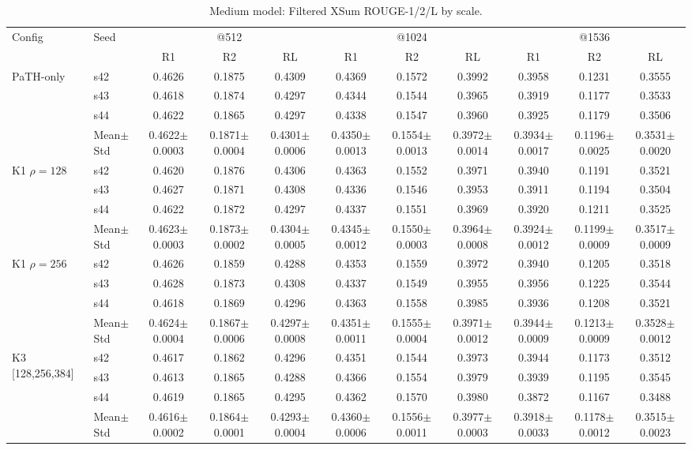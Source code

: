 \begin{table}[t]
\centering
\small
\begin{tabular}{llccccccccc}
\toprule
Config & Seed & \multicolumn{3}{c}{@512} & \multicolumn{3}{c}{@1024} & \multicolumn{3}{c}{@1536} \\
\cmidrule(lr){3-5} \cmidrule(lr){6-8} \cmidrule(lr){9-11}
 & & R1 & R2 & RL & R1 & R2 & RL & R1 & R2 & RL \\
\midrule
\multirow{4}{*}{PaTH-only} & s42 & 0.4626 & 0.1875 & 0.4309 & 0.4369 & 0.1572 & 0.3992 & 0.3958 & 0.1231 & 0.3555 \\
 & s43 & 0.4618 & 0.1874 & 0.4297 & 0.4344 & 0.1544 & 0.3965 & 0.3919 & 0.1177 & 0.3533 \\
 & s44 & 0.4622 & 0.1865 & 0.4297 & 0.4338 & 0.1547 & 0.3960 & 0.3925 & 0.1179 & 0.3506 \\
 & Mean$\pm$Std & 0.4622$\pm$0.0003 & 0.1871$\pm$0.0004 & 0.4301$\pm$0.0006 & 0.4350$\pm$0.0013 & 0.1554$\pm$0.0013 & 0.3972$\pm$0.0014 & 0.3934$\pm$0.0017 & 0.1196$\pm$0.0025 & 0.3531$\pm$0.0020 \\
\midrule
\multirow{4}{*}{K1 $\rho{=}128$} & s42 & 0.4620 & 0.1876 & 0.4306 & 0.4363 & 0.1552 & 0.3971 & 0.3940 & 0.1191 & 0.3521 \\
 & s43 & 0.4627 & 0.1871 & 0.4308 & 0.4336 & 0.1546 & 0.3953 & 0.3911 & 0.1194 & 0.3504 \\
 & s44 & 0.4622 & 0.1872 & 0.4297 & 0.4337 & 0.1551 & 0.3969 & 0.3920 & 0.1211 & 0.3525 \\
 & Mean$\pm$Std & 0.4623$\pm$0.0003 & 0.1873$\pm$0.0002 & 0.4304$\pm$0.0005 & 0.4345$\pm$0.0012 & 0.1550$\pm$0.0003 & 0.3964$\pm$0.0008 & 0.3924$\pm$0.0012 & 0.1199$\pm$0.0009 & 0.3517$\pm$0.0009 \\
\midrule
\multirow{4}{*}{K1 $\rho{=}256$} & s42 & 0.4626 & 0.1859 & 0.4288 & 0.4353 & 0.1559 & 0.3972 & 0.3940 & 0.1205 & 0.3518 \\
 & s43 & 0.4628 & 0.1873 & 0.4308 & 0.4337 & 0.1549 & 0.3955 & 0.3956 & 0.1225 & 0.3544 \\
 & s44 & 0.4618 & 0.1869 & 0.4296 & 0.4363 & 0.1558 & 0.3985 & 0.3936 & 0.1208 & 0.3521 \\
 & Mean$\pm$Std & 0.4624$\pm$0.0004 & 0.1867$\pm$0.0006 & 0.4297$\pm$0.0008 & 0.4351$\pm$0.0011 & 0.1555$\pm$0.0004 & 0.3971$\pm$0.0012 & 0.3944$\pm$0.0009 & 0.1213$\pm$0.0009 & 0.3528$\pm$0.0012 \\
\midrule
\multirow{4}{*}{K3 [128,256,384]} & s42 & 0.4617 & 0.1862 & 0.4296 & 0.4351 & 0.1544 & 0.3973 & 0.3944 & 0.1173 & 0.3512 \\
 & s43 & 0.4613 & 0.1865 & 0.4288 & 0.4366 & 0.1554 & 0.3979 & 0.3939 & 0.1195 & 0.3545 \\
 & s44 & 0.4619 & 0.1865 & 0.4295 & 0.4362 & 0.1570 & 0.3980 & 0.3872 & 0.1167 & 0.3488 \\
 & Mean$\pm$Std & 0.4616$\pm$0.0002 & 0.1864$\pm$0.0001 & 0.4293$\pm$0.0004 & 0.4360$\pm$0.0006 & 0.1556$\pm$0.0011 & 0.3977$\pm$0.0003 & 0.3918$\pm$0.0033 & 0.1178$\pm$0.0012 & 0.3515$\pm$0.0023 \\
\bottomrule
\end{tabular}
\caption{Medium model: Filtered XSum ROUGE-1/2/L by scale.}
\label{tab:appendix_medium_xsum}
\end{table}